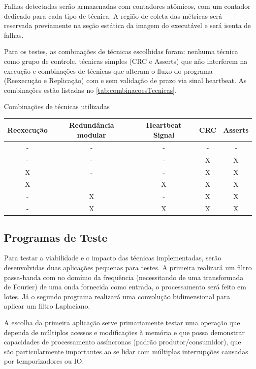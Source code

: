 Falhas detectadas serão armazenadas com contadores atômicos, com um contador dedicado para cada tipo de técnica. A região de coleta das métricas será reservada previamente na seção estática da imagem do executável e será isenta de falhas.

Para os testes, as combinações de técnicas escolhidas foram: nenhuma técnica como grupo de controle, técnicas simples (CRC e Asserts) que não interferem na execução e combinações de técnicas que alteram o fluxo do programa (Reexecução e Replicação) com e sem validação de prazo via sinal heartbeat. As combinações estão listadas no \autoref{tab:combinacoesTecnicas}.

\begin{quadro}[H]
    \centering
    \caption{Combinações de técnicas utilizadas}
    \begin{tabular}{|c|c|c|c|c|}
        \hline
        \rowcolor[HTML]{C0C0C0}
        \textbf{Reexecução} & \textbf{Redundância modular} & \textbf{Heartbeat Signal} & \textbf{CRC} & \textbf{Asserts} \\
        \hline
        - & - & - & - & - \\
        \hline
        - & - & - & X & X \\
        \hline
        X & - & - & X & X \\
        \hline
        X & - & X & X & X \\
        \hline
        - & X & - & X & X \\
        \hline
        - & X & X & X & X \\
        \hline
    \end{tabular}
    \label{tab:combinacoesTecnicas}
\end{quadro}

\subsection{Programas de Teste}

Para testar a viabilidade e o impacto das técnicas implementadas, serão desenvolvidas duas aplicações pequenas para testes. A primeira realizará um filtro passa-banda com no domínio da frequência (necessitando de uma transformada de Fourier) de uma onda fornecida como entrada, o processamento será feito em lotes. Já o segundo programa realizará uma convolução bidimensional para aplicar um filtro Laplaciano.

A escolha da primeira aplicação serve primariamente testar uma operação que dependa de múltiplos acessos e modificações à memória e que possa demonstrar capacidades de processamento assíncronas (padrão produtor/consumidor), que são particularmente importantes ao se lidar com múltiplas interrupções causadas por temporizadores ou IO.

